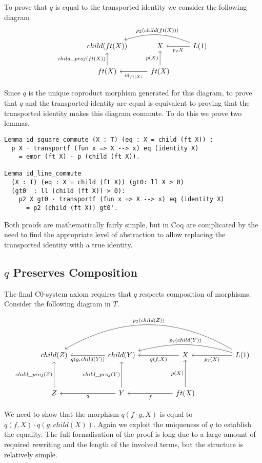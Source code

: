 To prove that $q$ is equal to the transported identity we consider the following
diagram
\[
\begin{tikzcd}
    child(ft(X)) &
    X & 
    L(1)
    \ar[l, "p_2 X"]
    \ar[ll, bend right=20, "p_2 (child(ft(X)))"'] \\
    ft(X)
    \ar[u, "child\_proj(ft(X))"] &
    ft(X)
    \ar[u, "p(X)"]
    \ar[l, "id_{ft(X)}"] &
\end{tikzcd}    
\]

Since $q$ is the unique coproduct morphism generated for this diagram, to prove
that $q$ and the transported identity are equal is equivalent to proving that
the transported identity makes this diagram commute. To do this we prove two
lemmas,
\begin{lstlisting}
Lemma id_square_commute (X : T) (eq : X = child (ft X)) : 
  p X · transportf (fun x => X --> x) eq (identity X)
    = emor (ft X) · p (child (ft X)).

Lemma id_line_commute 
  (X : T) (eq : X = child (ft X)) (gt0: ll X > 0) 
  (gt0' : ll (child (ft X)) > 0):
    p2 X gt0 · transportf (fun x => X --> x) eq (identity X)
      = p2 (child (ft X)) gt0'.
\end{lstlisting}
Both proofs are mathematically fairly simple, but in Coq are complicated by the
need to find the appropriate level of abstraction to allow replacing the
transported identity with a true identity.

\subsection{$q$ Preserves Composition}
The final C0-system axiom requires that $q$ respects composition of morphisms.
Consider the following diagram in $T$.

\[
\begin{tikzcd}[sep=huge]
    child(Z)&
    child(Y)
    \ar[l, "{q(g, child(Y))}"]&
    X
    \ar[l, "{q(f, X)}"]&
    L(1)
    \ar[l, "p_2(X)"]
    \ar[ll, bend right=15, "p_2(child(Y))"']
    \ar[lll, bend right=30, "p_2(child(Z))"']\\
    Z
    \ar[u,"child\_proj(Z)"]&
    Y
    \ar[l, "g"]
    \ar[u, "child\_proj(Y)"]&
    ft(X)
    \ar[l, "f"]
    \ar[u, "p(X)"]
\end{tikzcd}    
\]

We need to show that the morphism $q(f\cdot g, X)$ is equal to $q(f, X)\cdot
q(g, child(X))$. Again we exploit the uniqueness of $q$ to establish the
equality. The full formalisation of the proof is long due to a large amount of
required rewriting and the length of the involved terms, but the structure is
relatively simple.

